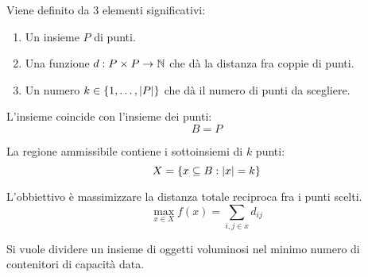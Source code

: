 \documentclass[\main/main.tex]{subfiles}
\begin{document}
\begin{multicols}{2}
\begin{problem}
        Viene definito da 3 elementi significativi:
        \begin{enumerate}
            \item Un insieme \(P\) di punti.
            \item Una funzione \(d: P\times P \rightarrow \mathbb{N}\) che dà la distanza fra coppie di punti.
            \item Un numero \(k \in \left\{1, \ldots, \left\lvert P\right\rvert\right\}\) che dà il numero di punti da scegliere.
        \end{enumerate}    
    \end{problem}
    \begin{definition}
        L'insieme coincide con l'insieme dei punti:
        \[
            B = P
        \]
    \end{definition}
    \begin{definition}
        La regione ammissibile contiene i sottoinsiemi di \(k\) punti:
        \[
            X = \left\{x \subseteq B: \left\lvert x\right\rvert = k\right\}
        \]
    \end{definition}
    \begin{definition}
         L'obbiettivo è massimizzare la distanza totale reciproca fra i punti scelti.
        \[
            \max_{x \in X} f(x) = \sum_{i, j \in x} d_{ij} 
        \]
    \end{definition}
    \begin{problem}
        Si vuole dividere un insieme di oggetti voluminosi nel minimo numero di contenitori di capacità data.
    

\end{problem}
\end{multicols}
\end{document}
